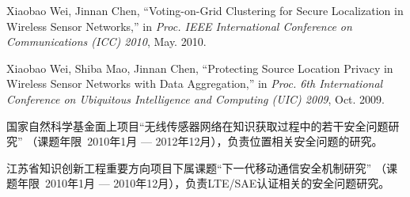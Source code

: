 \documentclass[phd,nobackinfo]{scutthesis}
\begin{document}

\begin{resume}

\begin{publications}
\item Xiaobao Wei, Jinnan Chen, ``Voting-on-Grid Clustering for Secure
  Localization in Wireless Sensor Networks,'' in \textsl{Proc. IEEE International
    Conference on Communications (ICC) 2010}, May. 2010.
\item Xiaobao Wei, Shiba Mao, Jinnan Chen, ``Protecting Source Location Privacy
  in Wireless Sensor Networks with Data Aggregation,'' in \textsl{Proc. 6th
    International Conference on Ubiquitous Intelligence and Computing (UIC)
    2009}, Oct. 2009.
\end{publications}
\begin{projects}
\item 国家自然科学基金面上项目``无线传感器网络在知识获取过程中的若干安全问题研究''
（课题年限~2010年1月 --- 2012年12月），负责位置相关安全问题的研究。
\item 江苏省知识创新工程重要方向项目下属课题``下一代移动通信安全机制研究''
（课题年限~2010年1月 --- 2010年12月），负责LTE/SAE认证相关的安全问题研究。
\end{projects}
\end{resume}
\end{document}
